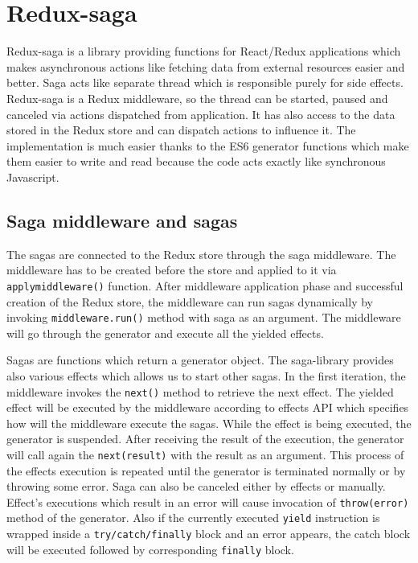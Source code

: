 \section{Redux-saga}
Redux-saga \cite{redux-saga} is a library providing functions for React/Redux applications which makes asynchronous actions like fetching data from external resources easier and better. Saga acts like separate thread which is responsible purely for side effects. Redux-saga is a Redux middleware, so the thread can be started, paused and canceled via actions dispatched from application. It has also access to the data stored in the Redux store and can dispatch actions to influence it. The implementation is much easier thanks to the ES6 generator functions which make them easier to write and read because the code acts exactly like synchronous Javascript.

\subsection{Saga middleware and sagas} \label{helpers}
The sagas are connected to the Redux store through the saga middleware. The middleware has to be created before the store and applied to it via \texttt{applymiddleware()} function. After middleware application phase and successful creation of the Redux store, the middleware can run sagas dynamically by invoking \texttt{middleware.run()} method with saga as an argument. The middleware will go through the generator and execute all the yielded effects.

Sagas are functions which return a generator object. The saga-library provides also various effects which allows us to start other sagas. In the first iteration, the middleware invokes the \texttt{next()} method to retrieve the next effect. The yielded effect will be executed by the middleware according to effects API which specifies how will the middleware execute the sagas. While the effect is being executed, the generator is suspended. After receiving the result of the execution, the generator will call again the \texttt{next(result)} with the result as an argument. This process of the effects execution is repeated until the generator is terminated normally or by throwing some error. Saga can   also be canceled either by effects or manually. Effect's executions which result in an error will cause invocation of \texttt{throw(error)} method of the generator. Also if the currently executed \texttt{yield} instruction is wrapped inside a \texttt{try/catch/finally} block and an error appears, the catch block will be executed followed by corresponding \texttt{finally} block.\cite{redux-saga-api}

